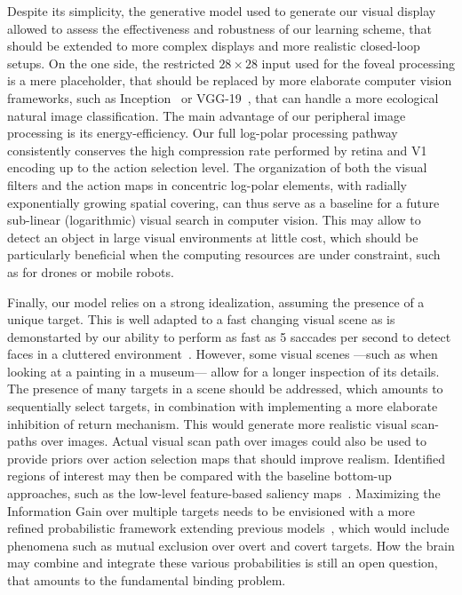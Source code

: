 Despite its simplicity, the generative model used to generate our visual display allowed to assess the effectiveness and robustness of our learning scheme, that should be extended to more complex displays and more realistic closed-loop setups. On the one side, the restricted $28\times28$ input used for the foveal processing is a mere placeholder, that should be replaced by more elaborate computer vision frameworks, such as Inception~\cite{szegedy2015going} or VGG-19~\cite{simonyan2014very}, that can handle a more ecological natural image classification. The main advantage of our peripheral image processing is its energy-efficiency. Our full log-polar processing pathway consistently conserves the high compression rate performed by retina and V1 encoding up to the action selection level. The organization of both the visual filters and the action maps in concentric log-polar elements, with radially exponentially growing spatial covering, can thus serve as a baseline for a future sub-linear (logarithmic) visual search in computer vision.
This may allow to detect an object in large visual environments at little cost, which should be particularly beneficial when the computing resources are under constraint, such as for drones or mobile robots.

Finally, our model relies on a strong idealization, assuming the presence of a unique target. This is well adapted to a fast changing visual scene as is demonstarted by our ability to perform as fast as 5 saccades per second to detect faces in a cluttered environment~\cite{Martin18}. However, some visual scenes ---such as when looking at a painting in a museum--- allow for a longer inspection of its details.  The presence of many targets in a scene should be addressed, which amounts to sequentially select targets, in combination with implementing a more elaborate inhibition of return mechanism. This would generate more realistic visual scan-paths over images. Actual visual scan path over images could also be used to provide priors over action selection maps that should improve realism.  Identified regions of interest may then be compared with the baseline bottom-up approaches, such as the low-level feature-based saliency maps~\cite{Itti01}. Maximizing the Information Gain over multiple targets needs to be envisioned with a more refined probabilistic framework extending previous models~\cite{Friston12}, which would include phenomena such as mutual exclusion over overt and covert targets. How the brain may combine and integrate these various probabilities is still an open question, that amounts to the fundamental binding problem.
